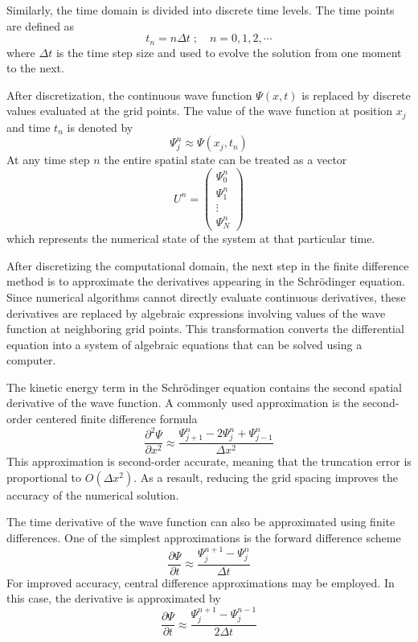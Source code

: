 \documentclass[11pt]{article}
\begin{document}
Similarly, the time domain is divided into discrete time levels. The time points are defined as 
\begin{equation}
	t_n = n \Delta t \; ; \quad n = 0, 1, 2, \cdots
\end{equation}
where $\Delta t$ is the time step size and used to evolve the solution from one moment to the next.

After discretization, the continuous wave function $\Psi (x,t)$ is replaced by discrete values evaluated at the grid points. The value of the wave function at position $x_j$ and time $t_n$ is denoted by
\begin{equation}
	\Psi_j^n \approx \Psi (x_j, t_n)
\end{equation}
At any time step $n$ the entire spatial state can be treated as a vector 
\begin{equation}
	U^n = \begin{pmatrix} \Psi_0^n \\ \Psi_1^n \\ \vdots \\ \Psi_N^n \end{pmatrix}
\end{equation}
which represents the numerical state of the system at that particular time.

After discretizing the computational domain, the next step in the finite difference method is to approximate the derivatives appearing in the Schrödinger equation. Since numerical algorithms cannot directly evaluate continuous derivatives, these derivatives are replaced by algebraic expressions involving values of the wave function at neighboring grid points. This transformation converts the differential equation into a system of algebraic equations that can be solved using a computer.

The kinetic energy term in the Schrödinger equation contains the second spatial derivative of the wave function. A commonly used approximation is the second-order centered finite difference formula
\begin{equation}
	\frac{\partial^2 \Psi}{\partial x^2} \approx \frac{\Psi_{j+1}^n - 2 \Psi_j^n + \Psi_{j-1}^n}{\Delta x^2}
\end{equation}
This approximation is second-order accurate, meaning that the truncation error is proportional to $O(\Delta x^2)$. As a resault, reducing the grid spacing improves the accuracy of the numerical solution.

The time derivative of the wave function can also be approximated using finite differences. One of the simplest approximations is the forward difference scheme
\begin{equation}
	\frac{\partial \Psi }{\partial t} \approx \frac{\Psi_j^{n+1} - \Psi_j^n}{\Delta t}
\end{equation}
For improved accuracy, central difference approximations may be employed. In this case, the derivative is approximated by
\begin{equation}
	\frac{\partial \Psi }{\partial t} \approx \frac{\Psi_j^{n+1} - \Psi_j^{n-1}}{2 \Delta t}
\end{equation}
\end{document}
